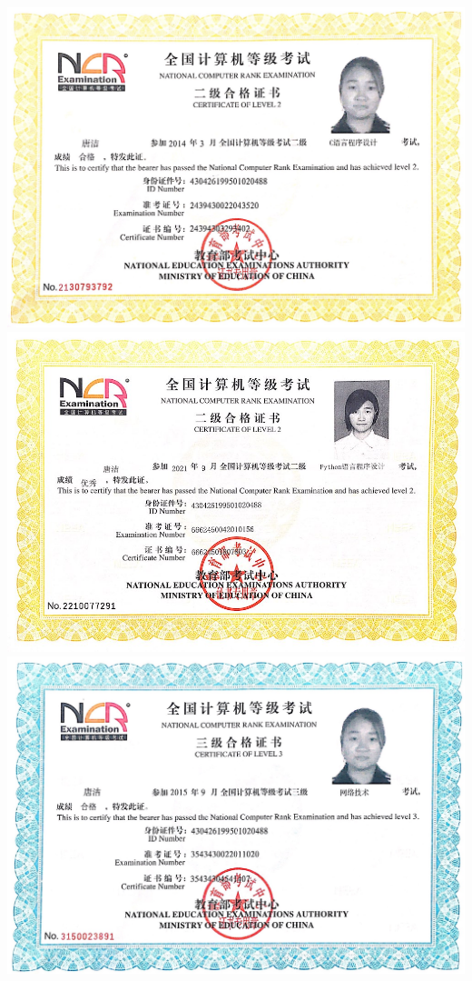 \documentclass[UFT8]{ctexart}%
\begin{document}
\begin{center}
\includegraphics[scale=0.22]{figs/计算机二级C.jpg }
\includegraphics[scale=0.4]{figs/计算机二级Python.jpg }
\includegraphics[scale=0.21]{figs/计算机三级证书.jpg }
\end{center}
\end{document}
